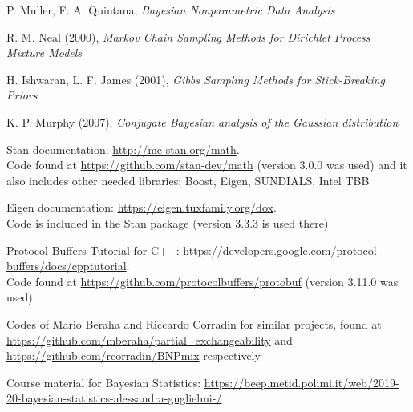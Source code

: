\documentclass[a4paper]{report}
\begin{document}
\begin{thebibliography}{9}
	 P. Muller, F. A. Quintana, \textit{Bayesian Nonparametric Data Analysis}
	
	 R. M. Neal (2000), \textit{Markov Chain Sampling Methods for Dirichlet Process Mixture Models}
	
	 H. Ishwaran, L. F. James (2001), \textit{Gibbs Sampling Methods for Stick-Breaking Priors}
	
	 K. P. Murphy (2007), \textit{Conjugate Bayesian analysis of the Gaussian distribution}
	
	 Stan documentation: \url{http://mc-stan.org/math}. \\
	Code found at \url{https://github.com/stan-dev/math} (version 3.0.0 was used) and it also includes other needed libraries: Boost, Eigen, SUNDIALS, Intel TBB
	
	 Eigen documentation: \url{https://eigen.tuxfamily.org/dox}. \\
	Code is included in the Stan package (version 3.3.3 is used there)
	
	 Protocol Buffers Tutorial for C++: \url{https://developers.google.com/protocol-buffers/docs/cpptutorial}. \\
	Code found at \url{https://github.com/protocolbuffers/protobuf} (version 3.11.0 was used)
	
	 Codes of Mario Beraha and Riccardo Corradin for similar projects, found at \url{https://github.com/mberaha/partial_exchangeability} and \url{https://github.com/rcorradin/BNPmix} respectively
	
	 Course material for Bayesian Statistics: \url{https://beep.metid.polimi.it/web/2019-20-bayesian-statistics-alessandra-guglielmi-/}
\end{thebibliography}
\end{document}
